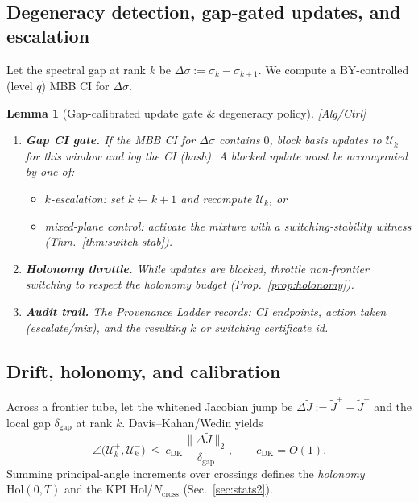 \documentclass[10pt]{article}
\newcommand{\cutq}{q}
\newcommand{\layertag}[1]{\textup{[#1]}}
\newtheorem{lemma}{Lemma}
\begin{document}
\subsection*{Degeneracy detection, gap-gated updates, and escalation}
Let the spectral gap at rank $k$ be $\Delta\sigma:=\sigma_k-\sigma_{k+1}$.
We compute a BY-controlled (level $\cutq$) MBB CI for $\Delta\sigma$.

\begin{lemma}[Gap-calibrated update gate \& degeneracy policy]\label{lem:deg}
\emph{\layertag{Alg/Ctrl}}
\begin{enumerate}[leftmargin=*,itemsep=2pt]
\item \textbf{Gap CI gate.} If the MBB CI for $\Delta\sigma$ contains $0$, \emph{block} basis updates to $\mathcal U_k$ for this window and log the CI (hash). A blocked update must be accompanied by one of:
\begin{itemize}[leftmargin=10pt]
\item \emph{$k$-escalation:} set $k\leftarrow k{+}1$ and recompute $\mathcal U_k$, or
\item \emph{mixed-plane control:} activate the mixture with a switching-stability witness (Thm.~\ref{thm:switch-stab}).
\end{itemize}
\item \textbf{Holonomy throttle.} While updates are blocked, throttle non-frontier switching to respect the holonomy budget (Prop.~\ref{prop:holonomy}).
\item \textbf{Audit trail.} The Provenance Ladder records: CI endpoints, action taken (escalate/mix), and the resulting $k$ or switching certificate id.
\end{enumerate}
\end{lemma}

\subsection*{Drift, holonomy, and calibration}
Across a frontier tube, let the whitened Jacobian jump be $\Delta \widetilde J:=\widetilde J^{+}-\widetilde J^{-}$ and the local gap $\delta_{\mathrm{gap}}$ at rank $k$.
Davis–Kahan/Wedin yields
\[
\angle\!\big(\mathcal U_k^+,\mathcal U_k^-\big)
\ \le\
c_{\mathrm{DK}}\frac{\|\Delta \widetilde J\|_2}{\delta_{\mathrm{gap}}},
\qquad c_{\mathrm{DK}}=O(1).
\]
Summing principal-angle increments over crossings defines the \emph{holonomy} $\mathrm{Hol}(0,T)$ and the KPI $\mathrm{Hol}/N_{\mathrm{cross}}$ (Sec.~\ref{sec:stats2}).
\end{document}
